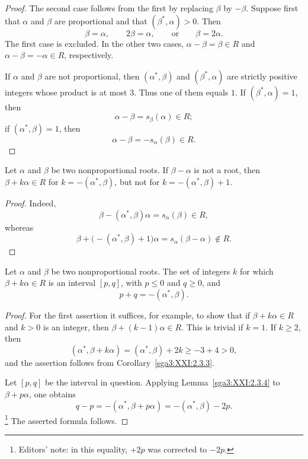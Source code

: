 \begin{proof}
The second case follows from the first by replacing \(\beta\) by
\(-\beta\). Suppose first that \(\alpha\) and \(\beta\) are
proportional and that \((\beta^\ast,\alpha)>0\). Then
\[
 \beta=\alpha,\qquad 2\beta=\alpha,\qquad\text{or}\qquad
 \beta=2\alpha.
\]
The first case is excluded. In the other two cases,
\(\alpha-\beta=\beta\in R\) and
\(\alpha-\beta=-\alpha\in R\), respectively.

If \(\alpha\) and \(\beta\) are not proportional, then
\((\alpha^\ast,\beta)\) and \((\beta^\ast,\alpha)\) are strictly
positive integers whose product is at most \(3\). Thus one of them
equals \(1\). If \((\beta^\ast,\alpha)=1\), then
\[
 \alpha-\beta=s_\beta(\alpha)\in R;
\]
if \((\alpha^\ast,\beta)=1\), then
\[
 \alpha-\beta=-s_\alpha(\beta)\in R.
\]
\end{proof}

\begin{lemma}\label{sga3:XXI:2.3.4}
Let \(\alpha\) and \(\beta\) be two nonproportional roots. If
\(\beta-\alpha\) is not a root, then
\(\beta+k\alpha\in R\) for \(k=-(\alpha^\ast,\beta)\), but not for
\(k=-(\alpha^\ast,\beta)+1\).
\end{lemma}

\begin{proof}
Indeed,
\[
 \beta-(\alpha^\ast,\beta)\alpha=s_\alpha(\beta)\in R,
\]
whereas
\[
 \beta+\bigl(-(\alpha^\ast,\beta)+1\bigr)\alpha
 =s_\alpha(\beta-\alpha)\notin R.
\]
\end{proof}

\begin{proposition}\label{sga3:XXI:2.3.5}
Let \(\alpha\) and \(\beta\) be two nonproportional roots. The set of
integers \(k\) for which \(\beta+k\alpha\in R\) is an interval
\([p,q]\), with \(p\leq0\) and \(q\geq0\), and
\[
 p+q=-(\alpha^\ast,\beta).
\]
\end{proposition}

\begin{proof}
For the first assertion it suffices, for example, to show that if
\(\beta+k\alpha\in R\) and \(k>0\) is an integer, then
\(\beta+(k-1)\alpha\in R\). This is trivial if \(k=1\). If
\(k\geq2\), then
\[
 (\alpha^\ast,\beta+k\alpha)
 =(\alpha^\ast,\beta)+2k\geq-3+4>0,
\]
and the assertion follows from Corollary~\ref{sga3:XXI:2.3.3}.

Let \([p,q]\) be the interval in question. Applying
Lemma~\ref{sga3:XXI:2.3.4} to \(\beta+p\alpha\), one obtains
\[
 q-p
 =-(\alpha^\ast,\beta+p\alpha)
 =-(\alpha^\ast,\beta)-2p.
\]
\footnote{Editors' note: in this equality, \(+2p\) was corrected to
\(-2p\).}
The asserted formula follows.
\end{proof}

